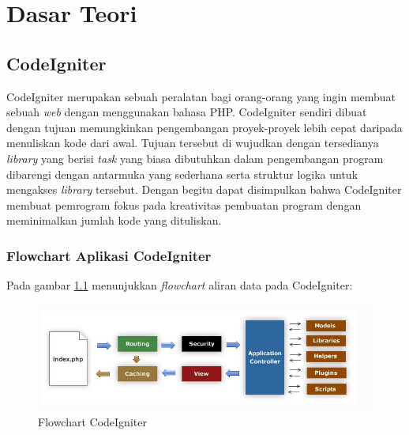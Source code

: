 \chapter{Dasar Teori}
\label{chap: dasarTeori}
		
\section{CodeIgniter}
\label{sec: codeigniter}

	CodeIgniter merupakan sebuah peralatan bagi orang-orang yang ingin membuat sebuah \textit{web} dengan menggunakan bahasa PHP. CodeIgniter sendiri dibuat dengan tujuan memungkinkan pengembangan proyek-proyek lebih cepat daripada menuliskan kode dari awal. Tujuan tersebut di wujudkan dengan tersedianya \textit{library} yang berisi \textit{task} yang biasa dibutuhkan dalam pengembangan program dibarengi dengan antarmuka yang sederhana serta struktur logika untuk mengakses \textit{library} tersebut. Dengan begitu dapat disimpulkan bahwa CodeIgniter membuat pemrogram fokus pada kreativitas pembuatan program dengan meminimalkan jumlah kode yang dituliskan.
	
	\subsection{Flowchart Aplikasi CodeIgniter}
	\label{sub: FlowAppCI}
	
	Pada gambar \ref{fig:flowchartCI} menunjukkan \textit{flowchart} aliran data pada CodeIgniter:
	\begin{figure}[H]
		\centering
		\includegraphics[scale=0.75]{Gambar/flowChartCI}
		\caption{Flowchart CodeIgniter}
		\label{fig:flowchartCI}
	\end{figure}
	
